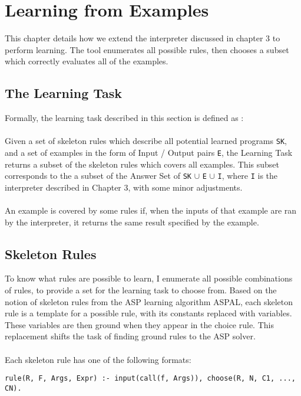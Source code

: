 \chapter{Learning from Examples}

This chapter details how we extend the interpreter discussed in chapter 3 to perform learning. The tool enumerates all possible rules, then chooses a subset which correctly evaluates all of the examples.

\section{The Learning Task}
Formally, the learning task described in this section is defined as : \\ \\
Given a set of skeleton rules which describe all potential learned programs \lstinline!SK!, and a set of examples in the form of Input / Output pairs \lstinline!E!, the Learning Task returns a subset of the skeleton rules which covers all examples. This subset corresponds to the a subset of the Answer Set of \lstinline!SK! $\cup$ \lstinline!E! $\cup$ \lstinline!I!, where \lstinline!I! is the interpreter described in Chapter 3, with some minor adjustments.\\ \\
An example is covered by some rules if, when the inputs of that example are ran by the interpreter, it returns the same result specified by the example.

\section{Skeleton Rules}
To know what rules are possible to learn, I enumerate all possible combinations of rules, to provide a set for the learning task to choose from. Based on the notion of skeleton rules from the ASP learning algorithm ASPAL, each skeleton rule is a template for a possible rule, with its constants replaced with variables. These variables are then ground when they appear in the choice rule. This replacement shifts the task of finding ground rules to the ASP solver.\\ \\
Each skeleton rule has one of the following formats: \\

\begin{lstlisting}
rule(R, F, Args, Expr) :- input(call(f, Args)), choose(R, N, C1, ..., CN).
\end{lstlisting}
\mbox{} \\

